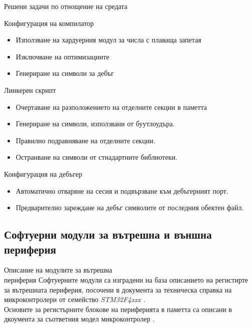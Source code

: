 \documentclass[handout]{beamer}
\begin{document}
\begin{frame}{Решени задачи по отнощение на средата}

		\begin{block}{Конфигурация на компилатор}
			\begin{itemize}
				\pause
				\item Използване на хардуерния модул за числа с плаваща запетая
				\pause
				\item Изключване на оптимизациите
				\pause
				\item Генериране на символи за дебъг
			\end{itemize}
		\end{block}
\end{frame}

\begin{frame}[t]
		\begin{block}{Линкерен скрипт}
			\begin{itemize}
				\pause
				\item Очертаване на разположението на отделните секции в паметта
				\pause
				\item Генериране на символи, използвани от буутлоудъра.
				\pause
				\item Правилно подравняване на отделните секции.
				\pause
				\item Остранване на символи от стнадартните библиотеки.
			\end{itemize}
		\end{block}

		\pause

	\begin{block}{Конфигурация на дебъгер}
		\begin{itemize}
			\pause
			\item Автоматично отваряне на сесия и подвързване към дебъгерният порт.
			\pause
			\item Предварително зареждане на дебъг символите от последния обектен файл.
		\end{itemize}
	\end{block}

\end{frame}


\subsection{Софтуерни модули за вътрешна и външна\\периферия}

\begin{frame}{Описание на модулите за вътрешна\\периферия}
	\pause
	Софтуерните модули са изградени на база описанието на регистирте за вътрешната периферия, посочени в 
	документа за техническа справка на микроконтролери от семейство \textit{STM32F4xxx} \cite{stmcurefman}.\\[1.5em]

	\pause
	Основите за регистърните блокове на периферията в паметта са описани в дкоумента за съответния
	модел микроконтролер \cite{stmmcudatasheet}.

\end{frame}
\end{document}
